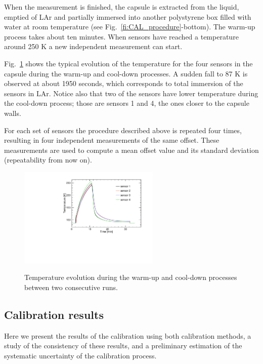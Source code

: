 When the measurement is finished, the capsule is extracted from the liquid, emptied of LAr and partially immersed into another polystyrene box filled with water at room temperature (see Fig.~\ref{fi:CAL_procedure}-bottom). The warm-up process takes about ten minutes. When sensors have reached a temperature around 250 K a new independent measurement can start. 

Fig.~\ref{fi:CAL_pre} shows the typical evolution of the temperature for the four sensors in the capsule during the warm-up and cool-down processes. A sudden fall to 87 K is observed at about 1950 seconds, which corresponds to total immersion of the sensors in LAr. Notice also that two of the sensors have lower temperature during the cool-down process; those are sensors 1 and 4, the ones closer to the capsule walls.  

For each set of sensors the procedure described above is repeated four times, resulting in four independent measurements of the same offset. These measurements are used to compute a mean offset value and its standard deviation (repeatability from now on).  

\begin{figure}[htbp]
\centering
{\includegraphics[width=0.6\textwidth]{images/figure_9.pdf}}
\caption{Temperature evolution during the warm-up and cool-down processes between two consecutive runs. }
\label{fi:CAL_pre}
\end{figure}


\subsection{Calibration results}
\label{sec:calib_results}
\noindent Here we present the results of the calibration using both calibration methods, a study of the consistency of these results, and a preliminary estimation of the systematic uncertainty of the calibration process.

